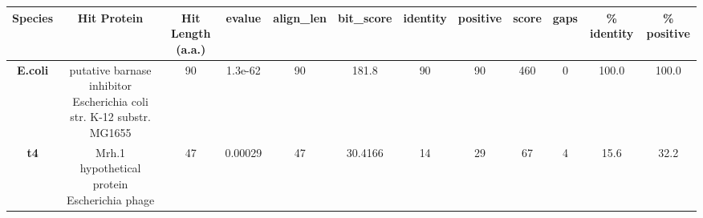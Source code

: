 \begin{tabular}{|c|c|c|c|c|c|c|c|c|c|c|c|} \hline
\textbf{Species} & \textbf{Hit Protein} & \textbf{Hit Length (a.a.)} & \textbf{evalue} & \textbf{align\_len} & \textbf{bit\_score} & \textbf{identity} & \textbf{positive} & \textbf{score} & \textbf{gaps} & \textbf{\% identity} & \textbf{\% positive} \\ \hline
\textbf{E.coli} & putative barnase inhibitor Escherichia coli str. K-12 substr. MG1655 & 90 & 1.3e-62 & 90 & 181.8 & 90 & 90 & 460 & 0 & 100.0 & 100.0\\
\textbf{t4} & Mrh.1 hypothetical protein Escherichia phage  & 47 & 0.00029 & 47 & 30.4166 & 14 & 29 & 67 & 4 & 15.6 & 32.2\\
\hline \end{tabular}
